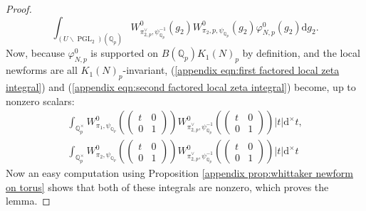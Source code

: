 \documentclass[12pt]{amsart}
\theoremstyle{definition}
\newcommand{\Q}{\mathbb{Q}}
\renewcommand{\d}{\mathrm{d}}
\begin{document}
\begin{proof}
\begin{equation}
        \int_{(U\backslash \operatorname{PGL}_2)(\Q_p)}W_{\pi_{2,p}^\vee,\psi_{\Q_p}^{-1}}^0(g_2) W^0_{\pi_2,p,\psi_{\Q_p}}(g_2)\varphi^0_{N,p} (g_2) \d g_2.
\end{equation}
Now, because $\varphi^0_{N,p}$ is supported on $B(\Q_p) K_1(N)_p$ by definition, and the local newforms are all $K_1(N)_p$-invariant, (\ref{appendix eqn:first factored local zeta integral}) and (\ref{appendix eqn:second factored local zeta integral}) become, up to nonzero scalars:
\begin{equation*}
\begin{split}
    \int_{\Q_p^\times} W^0_{\pi_1,\psi_{\Q_p}} \left(\begin{pmatrix}
         t & 0 \\ 0 & 1
    \end{pmatrix}\right) W_{\pi_{2,p}^\vee, \psi_{\Q_p}^{-1}}^0\left(\begin{pmatrix}
         t & 0 \\ 0 & 1
    \end{pmatrix}\right) |t| \d ^\times
t,\\   \int_{\Q_p^\times} W^0_{\pi_2,\psi_{\Q_p}} \left(\begin{pmatrix}
         t & 0 \\ 0 & 1
    \end{pmatrix}\right) W_{\pi_{2,p}^\vee, \psi_{\Q_p}^{-1}}^0\left(\begin{pmatrix}
         t & 0 \\ 0 & 1
    \end{pmatrix}\right) |t| \d ^\times t
    \end{split}
\end{equation*}
Now an easy computation using Proposition \ref{appendix prop:whittaker newform on torus} shows that both of these integrals are nonzero, which proves the lemma.
\end{proof}
\end{document}
